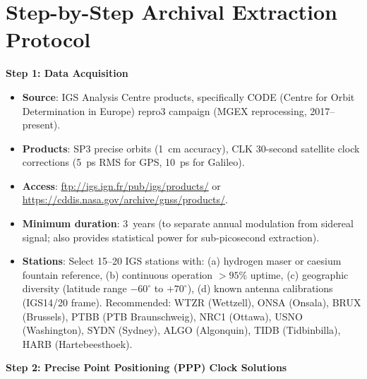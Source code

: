 \documentclass[11pt,a4paper]{article}
\begin{document}
\section{Step-by-Step Archival Extraction Protocol}
\label{sec:GPS-protocol}

\begin{tcolorbox}[colback=green!3!white, colframe=green!60!black,
  title=\textbf{GPS 59~ps Extraction Protocol --- Actionable for Geodesists}]

\textbf{Step 1: Data Acquisition}

\begin{itemize}[nosep]
\item \textbf{Source}: IGS Analysis Centre products, specifically
  CODE (Centre for Orbit Determination in Europe) repro3 campaign
  (MGEX reprocessing, 2017--present).
\item \textbf{Products}: SP3 precise orbits (1~cm accuracy),
  CLK 30-second satellite clock corrections (5~ps RMS for GPS,
  10~ps for Galileo).
\item \textbf{Access}: \url{ftp://igs.ign.fr/pub/igs/products/} or
  \url{https://cddis.nasa.gov/archive/gnss/products/}.
\item \textbf{Minimum duration}: 3~years (to separate annual modulation
  from sidereal signal; also provides statistical power for
  sub-picosecond extraction).
\item \textbf{Stations}: Select 15--20 IGS stations with:
  (a) hydrogen maser or caesium fountain reference,
  (b) continuous operation $>95\%$ uptime,
  (c) geographic diversity (latitude range $-60^\circ$ to $+70^\circ$),
  (d) known antenna calibrations (IGS14/20 frame).
  Recommended: WTZR (Wettzell), ONSA (Onsala), BRUX (Brussels),
  PTBB (PTB Braunschweig), NRC1 (Ottawa), USNO (Washington),
  SYDN (Sydney), ALGO (Algonquin), TIDB (Tidbinbilla), HARB (Hartebeesthoek).
\end{itemize}

\textbf{Step 2: Precise Point Positioning (PPP) Clock Solutions}


\end{tcolorbox}
\end{document}

